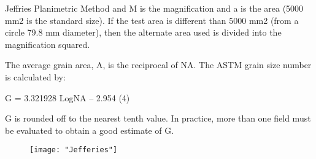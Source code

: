 \documentclass[10pt]{beamer}
\begin{document}
{\begin{frame}[fragile]{Jeffries Planimetric Method}
and M is the magnification and a is the area (5000 mm2 is the standard size). If the test area is different than 5000 mm2 (from a circle 79.8 mm diameter), then the alternate area used is divided into the magnification squared.

The average grain area, A, is the reciprocal of NA. The ASTM grain size number is calculated by:

G = 3.321928 LogNA  –  2.954            (4)

G is rounded off to the nearest tenth value. In practice, more than one field must be evaluated to obtain a good estimate of G.

\begin{figure}[H]
\texttt{[image: "Jefferies"]}
\end{figure}
    
\end{frame}
}
\end{document}
